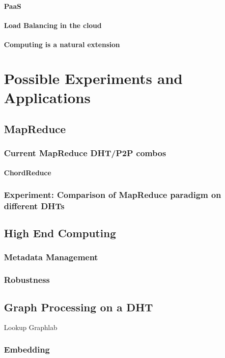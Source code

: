 \documentclass[10pt,letterpaper]{report}
\begin{document}
\subsubsection{PaaS}
\subsubsection{Load Balancing in the cloud}
\subsubsection{Computing is a natural extension}

\chapter{Possible Experiments and Applications}


\section{MapReduce}
\subsection{Current MapReduce DHT/P2P combos}
\subsubsection{ChordReduce}
\subsection{Experiment: Comparison of MapReduce paradigm on different DHTs}


\section{High End Computing}
\subsection{Metadata Management}
\subsection{Robustness}

\section{Graph Processing on a DHT}
Lookup Graphlab
\subsection{Embedding}
\end{document}
